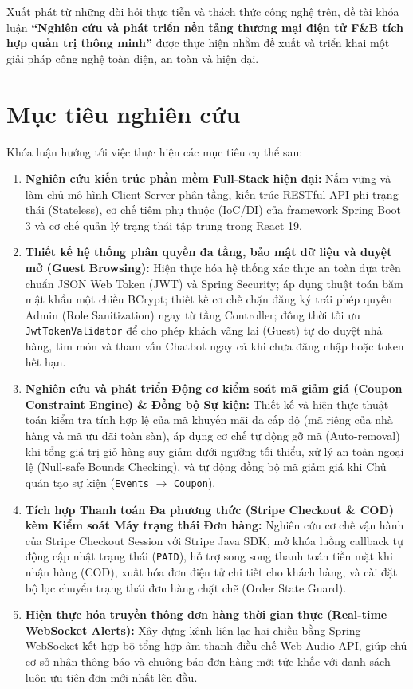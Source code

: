 \documentclass{uetgraduation}
\begin{document}
Xuất phát từ những đòi hỏi thực tiễn và thách thức công nghệ trên, đề tài khóa luận \textbf{``Nghiên cứu và phát triển nền tảng thương mại điện tử F\&B tích hợp quản trị thông minh''} được thực hiện nhằm đề xuất và triển khai một giải pháp công nghệ toàn diện, an toàn và hiện đại.

\section{Mục tiêu nghiên cứu}
Khóa luận hướng tới việc thực hiện các mục tiêu cụ thể sau:
\begin{enumerate}
    \item \textbf{Nghiên cứu kiến trúc phần mềm Full-Stack hiện đại:} Nắm vững và làm chủ mô hình Client-Server phân tầng, kiến trúc RESTful API phi trạng thái (Stateless), cơ chế tiêm phụ thuộc (IoC/DI) của framework Spring Boot 3 và cơ chế quản lý trạng thái tập trung trong React 19.
    \item \textbf{Thiết kế hệ thống phân quyền đa tầng, bảo mật dữ liệu và duyệt mở (Guest Browsing):} Hiện thực hóa hệ thống xác thực an toàn dựa trên chuẩn JSON Web Token (JWT) và Spring Security; áp dụng thuật toán băm mật khẩu một chiều BCrypt; thiết kế cơ chế chặn đăng ký trái phép quyền Admin (Role Sanitization) ngay từ tầng Controller; đồng thời tối ưu \texttt{JwtTokenValidator} để cho phép khách vãng lai (Guest) tự do duyệt nhà hàng, tìm món và tham vấn Chatbot ngay cả khi chưa đăng nhập hoặc token hết hạn.
    \item \textbf{Nghiên cứu và phát triển Động cơ kiểm soát mã giảm giá (Coupon Constraint Engine) \& Đồng bộ Sự kiện:} Thiết kế và hiện thực thuật toán kiểm tra tính hợp lệ của mã khuyến mãi đa cấp độ (mã riêng của nhà hàng và mã ưu đãi toàn sàn), áp dụng cơ chế tự động gỡ mã (Auto-removal) khi tổng giá trị giỏ hàng suy giảm dưới ngưỡng tối thiểu, xử lý an toàn ngoại lệ (Null-safe Bounds Checking), và tự động đồng bộ mã giảm giá khi Chủ quán tạo sự kiện (\texttt{Events} $\to$ \texttt{Coupon}).
    \item \textbf{Tích hợp Thanh toán Đa phương thức (Stripe Checkout \& COD) kèm Kiểm soát Máy trạng thái Đơn hàng:} Nghiên cứu cơ chế vận hành của Stripe Checkout Session với Stripe Java SDK, mở khóa luồng callback tự động cập nhật trạng thái (\texttt{PAID}), hỗ trợ song song thanh toán tiền mặt khi nhận hàng (COD), xuất hóa đơn điện tử chi tiết cho khách hàng, và cài đặt bộ lọc chuyển trạng thái đơn hàng chặt chẽ (Order State Guard).
    \item \textbf{Hiện thực hóa truyền thông đơn hàng thời gian thực (Real-time WebSocket Alerts):} Xây dựng kênh liên lạc hai chiều bằng Spring WebSocket kết hợp bộ tổng hợp âm thanh điều chế Web Audio API, giúp chủ cơ sở nhận thông báo và chuông báo đơn hàng mới tức khắc với danh sách luôn ưu tiên đơn mới nhất lên đầu.

\end{enumerate}
\end{document}
